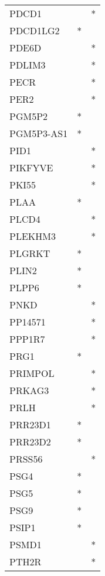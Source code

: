 \begin{longtable}{lcc}
PDCD1          &           &       * \\
PDCD1LG2       &         * &         \\
PDE6D          &           &       * \\
PDLIM3         &           &       * \\
PECR           &           &       * \\
PER2           &           &       * \\
PGM5P2         &         * &         \\
PGM5P3-AS1     &         * &         \\
PID1           &           &       * \\
PIKFYVE        &           &       * \\
PKI55          &           &       * \\
PLAA           &         * &         \\
PLCD4          &           &       * \\
PLEKHM3        &           &       * \\
PLGRKT         &         * &         \\
PLIN2          &         * &         \\
PLPP6          &         * &         \\
PNKD           &           &       * \\
PP14571        &           &       * \\
PPP1R7         &           &       * \\
PRG1           &         * &         \\
PRIMPOL        &           &       * \\
PRKAG3         &           &       * \\
PRLH           &           &       * \\
PRR23D1        &         * &         \\
PRR23D2        &         * &         \\
PRSS56         &           &       * \\
PSG4           &         * &         \\
PSG5           &         * &         \\
PSG9           &         * &         \\
PSIP1          &         * &         \\
PSMD1          &           &       * \\
PTH2R          &           &       * \\

\end{longtable}
